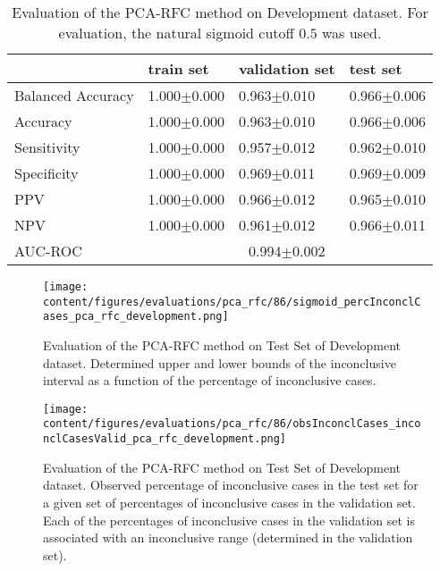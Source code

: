 \begin{table}[ht]
  \caption{Evaluation of the PCA-RFC method on Development dataset. 
  For evaluation, the natural sigmoid cutoff $0.5$ was used.}
  \centering
  \begin{tabular}{llll}
      \hline
                        & train set         & validation set      & test set             \\
      \hline
      Balanced Accuracy & 1.000$\pm$0.000   &   0.963$\pm$0.010    &  0.966$\pm$0.006   \\
      Accuracy          & 1.000$\pm$0.000    &   0.963$\pm$0.010  &  0.966$\pm$0.006    \\
      Sensitivity       &  1.000$\pm$0.000   &   0.957$\pm$0.012   &  0.962$\pm$0.010   \\
      Specificity       & 1.000$\pm$0.000    &   0.969$\pm$0.011  &  0.969$\pm$0.009   \\
      PPV               &  1.000$\pm$0.000   &   0.966$\pm$0.012   &  0.965$\pm$0.010   \\
      NPV               &  1.000$\pm$0.000   &   0.961$\pm$0.012  &  0.966$\pm$0.011   \\
      \hline
      AUC-ROC          &  \multicolumn{3}{c}{0.994$\pm$0.002}  \\
      \hline
  \end{tabular}
 \label{t1:erc_perf_eval_table}
\end{table}

\begin{figure}[t]
  \centering
  \texttt{[image: content/figures/evaluations/pca\_rfc/86/sigmoid\_percInconclCases\_pca\_rfc\_development.png]}
  \caption{Evaluation of the PCA-RFC method on Test Set of Development dataset. 
  Determined upper and lower bounds of the inconclusive interval as a function of the percentage of inconclusive cases.} 
  \label{fig:pca_rfc_percInconclCases_development}
\end{figure}


\begin{figure}[h]
  \centering
  \texttt{[image: content/figures/evaluations/pca\_rfc/86/obsInconclCases\_inconclCasesValid\_pca\_rfc\_development.png]}
  \caption{Evaluation of the PCA-RFC method on Test Set of Development dataset.
  Observed percentage of inconclusive cases in the test set 
  for a given set of percentages of inconclusive cases in the validation set.
  Each of the percentages of inconclusive cases in the validation set is associated 
  with an inconclusive range (determined in the validation set).} 
  \label{fig:obsInconclCases_inconclCasesValid_pca_rfc_development}
\end{figure} 


